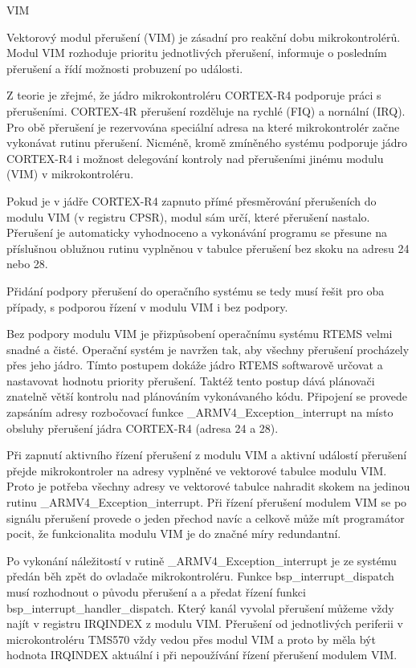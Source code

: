 \secc	VIM

Vektorový modul přerušení (VIM) je zásadní pro reakční dobu mikrokontrolérů.
Modul VIM rozhoduje prioritu jednotlivých přerušení, informuje o posledním přerušení a řídí možnosti probuzení po události.

Z teorie je zřejmé, že jádro mikrokontroléru CORTEX-R4 podporuje práci s přerušeními.
CORTEX-4R přerušení rozděluje na rychlé (FIQ) a nornální (IRQ).
Pro obě přerušení je rezervována speciální adresa na které mikrokontrolér začne vykonávat rutinu přerušení.
Nicméně, kromě zmíněného systému podporuje jádro CORTEX-R4 i možnost delegování kontroly nad přerušeními jinému modulu (VIM) v mikrokontroléru.

Pokud je v jádře CORTEX-R4 zapnuto přímé přesměrování přerušeních do modulu VIM (v registru CPSR), modul sám určí, které přerušení nastalo.
Přerušení je automaticky vyhodnoceno a vykonávání programu se přesune na příslušnou oblužnou rutinu vyplněnou v tabulce přerušení bez skoku na adresu 24 nebo 28.

Přidání podpory přerušení do operačního systému se tedy musí řešit pro oba případy, s podporou řízení v modulu VIM i bez podpory.

Bez podpory modulu VIM je přizpůsobení operačnímu systému RTEMS velmi snadné a čisté.
Operační systém je navržen tak, aby všechny přerušení procházely přes jeho jádro.
Tímto postupem dokáže jádro RTEMS softwarově určovat a nastavovat hodnotu priority přerušení.
Taktéž tento postup dává plánovači znatelně větší kontrolu nad plánováním vykonávaného kódu.
Připojení se provede zapsáním adresy rozbočovací funkce \_ARMV4\_Exception\_interrupt na místo obsluhy přerušení jádra CORTEX-R4 (adresa 24 a 28).

Při zapnutí aktivního řízení přerušení z modulu VIM a aktivní událostí přerušení přejde mikrokontroler na adresy vyplněné ve vektorové tabulce modulu VIM.
Proto je potřeba všechny adresy ve vektorové tabulce nahradit skokem na jedinou rutinu \_ARMV4\_Exception\_interrupt.
Při řízení přerušení modulem VIM se po signálu přerušení provede o jeden přechod navíc a celkově může mít programátor pocit, že funkcionalita modulu VIM je do značné míry redundantní.

Po vykonání náležitostí v rutině \_ARMV4\_Exception\_interrupt je ze systému předán běh zpět do ovladače mikrokontroléru.
Funkce bsp\_interrupt\_dispatch musí rozhodnout o původu přerušení a a předat řízení funkci bsp\_interrupt\_handler\_dispatch.
Který kanál vyvolal přerušení můžeme vždy najít v registru IRQINDEX z modulu VIM.
Přerušení od jednotlivých periferii v microkontroléru TMS570 vždy vedou přes modul VIM a proto by měla být hodnota IRQINDEX aktuální i při nepoužívání řízení přerušení modulem VIM.

